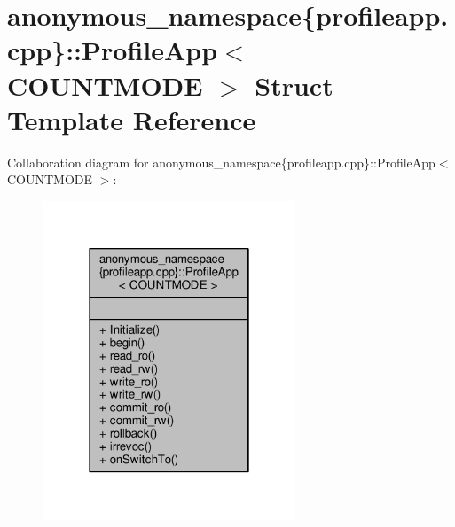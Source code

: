 \hypertarget{structanonymous__namespace_02profileapp_8cpp_03_1_1ProfileApp}{\section{anonymous\-\_\-namespace\{profileapp.\-cpp\}\-:\-:Profile\-App$<$ C\-O\-U\-N\-T\-M\-O\-D\-E $>$ Struct Template Reference}
\label{structanonymous__namespace_02profileapp_8cpp_03_1_1ProfileApp}
}


Collaboration diagram for anonymous\-\_\-namespace\{profileapp.\-cpp\}\-:\-:Profile\-App$<$ C\-O\-U\-N\-T\-M\-O\-D\-E $>$\-:
\nopagebreak
\begin{figure}[H]
\begin{center}
\leavevmode
\includegraphics[width=214pt]{structanonymous__namespace_02profileapp_8cpp_03_1_1ProfileApp__coll__graph}
\end{center}
\end{figure}
